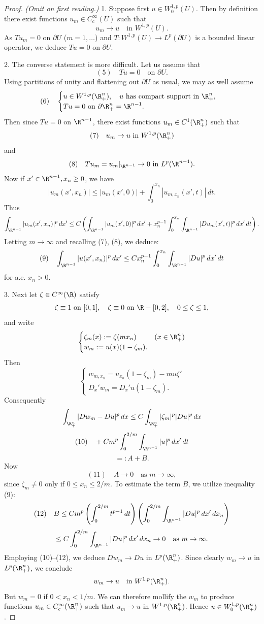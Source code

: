 \begin{proof} \textit{(Omit on first reading.)}
1. Suppose first $u \in W_0^{1,p}(U)$. Then by definition there exist functions $u_m \in C_c^\infty(U)$ such that
$$u_m \to u \quad \text{in } W^{1,p}(U).$$
As $Tu_m = 0$ on $\partial U$ ($m = 1,\ldots$) and $T : W^{1,p}(U) \to L^p(\partial U)$ is a bounded linear operator, we deduce $Tu = 0$ on $\partial U$.

2. The converse statement is more difficult. Let us assume that
$$(5) \quad Tu = 0 \quad \text{on } \partial U.$$
Using partitions of unity and flattening out $\partial U$ as usual, we may as well assume
$$(6) \quad \begin{cases} u \in W^{1,p}(\R_+^n), \quad u \text{ has compact support in } \R_+^n, \\ Tu = 0 \text{ on } \partial \R_+^n = \R^{n-1}. \end{cases}$$
Then since $Tu = 0$ on $\R^{n-1}$, there exist functions $u_m \in C^1(\R_+^n)$ such that
$$(7) \quad u_m \to u \text{ in } W^{1,p}(\R_+^n)$$
and
$$(8) \quad Tu_m = u_m|_{\R^{n-1}} \to 0 \text{ in } L^p(\R^{n-1}).$$
Now if $x' \in \R^{n-1}, x_n \ge 0$, we have
$$|u_m(x', x_n)| \le |u_m(x', 0)| + \int_0^{x_n} |u_{m,x_n}(x',t)| \, dt.$$
Thus
$$\int_{\R^{n-1}} |u_m(x', x_n)|^p \, dx' \le C \left( \int_{\R^{n-1}} |u_m(x', 0)|^p \, dx' + x_n^{p-1} \int_0^{x_n} \int_{\R^{n-1}} |Du_m(x',t)|^p \, dx' \, dt \right).$$
Letting $m \to \infty$ and recalling (7), (8), we deduce:
$$(9) \quad \int_{\R^{n-1}} |u(x', x_n)|^p \, dx' \le Cx_n^{p-1} \int_0^{x_n} \int_{\R^{n-1}} |Du|^p \, dx' \, dt$$
for a.e. $x_n > 0$.

3. Next let $\zeta \in C^\infty(\R)$ satisfy
$$\zeta \equiv 1 \text{ on } [0,1], \quad \zeta \equiv 0 \text{ on } \R - [0,2], \quad 0 \le \zeta \le 1,$$
and write
$$\begin{cases} \zeta_m(x) := \zeta(mx_n) & (x \in \R_+^n) \\ w_m := u(x)(1 - \zeta_m). \end{cases}$$
Then
$$\begin{cases} w_{m,x_n} = u_{x_n}(1 - \zeta_m) - mu\zeta' \\ D_x' w_m = D_x' u(1 - \zeta_m). \end{cases}$$
Consequently
$$\int_{\R_+^n} |Dw_m - Du|^p \, dx \le C \int_{\R_+^n} |\zeta_m|^p |Du|^p \, dx$$
$$(10) \quad + Cm^p \int_0^{2/m} \int_{\R^{n-1}} |u|^p \, dx' \, dt$$
$$=: A + B.$$
Now
$$(11) \quad A \to 0 \quad \text{as } m \to \infty,$$
since $\zeta_m \ne 0$ only if $0 \le x_n \le 2/m$. To estimate the term $B$, we utilize inequality (9):
$$(12) \quad B \le Cm^p \left(\int_0^{2/m} t^{p-1} \, dt\right) \left(\int_0^{2/m} \int_{\R^{n-1}} |Du|^p \, dx' \, dx_n\right)$$
$$\le C \int_0^{2/m} \int_{\R^{n-1}} |Du|^p \, dx' \, dx_n \to 0 \quad \text{as } m \to \infty.$$
Employing (10)--(12), we deduce $Dw_m \to Du$ in $L^p(\R_+^n)$. Since clearly $w_m \to u$ in $L^p(\R_+^n)$, we conclude
$$w_m \to u \quad \text{in } W^{1,p}(\R_+^n).$$
But $w_m = 0$ if $0 < x_n < 1/m$. We can therefore mollify the $w_m$ to produce functions $u_m \in C_c^\infty(\R_+^n)$ such that $u_m \to u$ in $W^{1,p}(\R_+^n)$. Hence $u \in W_0^{1,p}(\R_+^n)$.
\end{proof}

